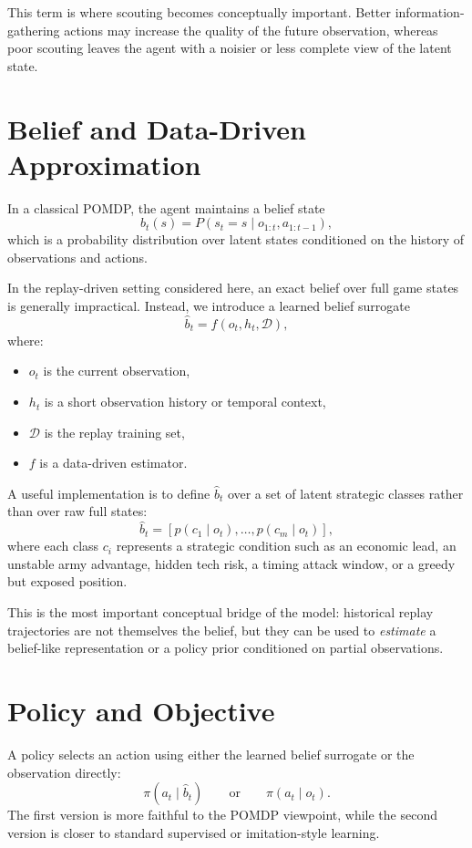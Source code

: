 \documentclass[11pt,a4paper]{article}
\begin{document}
This term is where scouting becomes conceptually important. Better information-gathering actions may increase the quality of the future observation, whereas poor scouting leaves the agent with a noisier or less complete view of the latent state.

\section{Belief and Data-Driven Approximation}
In a classical POMDP, the agent maintains a belief state
\[
b_t(s) = P(s_t = s \mid o_{1:t}, a_{1:t-1}),
\]
which is a probability distribution over latent states conditioned on the history of observations and actions.

In the replay-driven setting considered here, an exact belief over full game states is generally impractical. Instead, we introduce a learned belief surrogate
\[
\hat{b}_t = f(o_t, h_t, \mathcal{D}),
\]
where:
\begin{itemize}[leftmargin=1.8em]
    \item $o_t$ is the current observation,
    \item $h_t$ is a short observation history or temporal context,
    \item $\mathcal{D}$ is the replay training set,
    \item $f$ is a data-driven estimator.
\end{itemize}

A useful implementation is to define $\hat{b}_t$ over a set of latent strategic classes rather than over raw full states:
\[
\hat{b}_t = [p(c_1\mid o_t), \dots, p(c_m\mid o_t)],
\]
where each class $c_i$ represents a strategic condition such as an economic lead, an unstable army advantage, hidden tech risk, a timing attack window, or a greedy but exposed position.

This is the most important conceptual bridge of the model: historical replay trajectories are not themselves the belief, but they can be used to \emph{estimate} a belief-like representation or a policy prior conditioned on partial observations.

\section{Policy and Objective}
A policy selects an action using either the learned belief surrogate or the observation directly:
\[
\pi(a_t\mid \hat{b}_t)
\qquad \text{or} \qquad
\pi(a_t\mid o_t).
\]
The first version is more faithful to the POMDP viewpoint, while the second version is closer to standard supervised or imitation-style learning.
\end{document}
